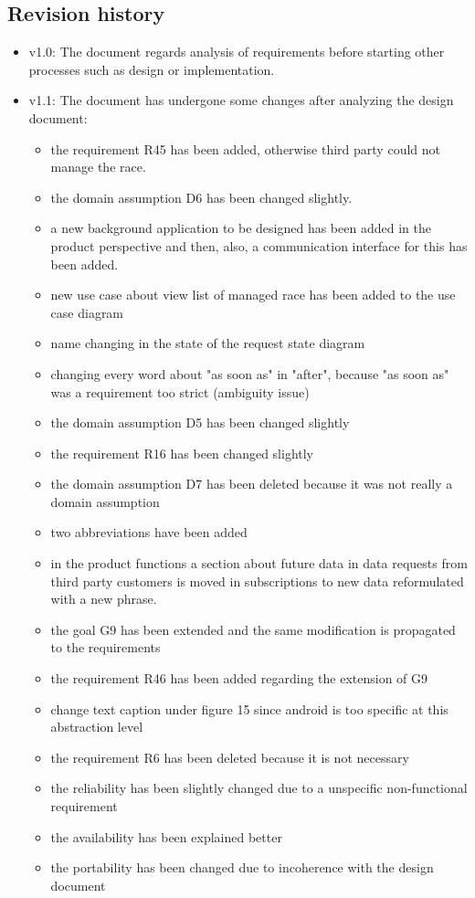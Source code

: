 \subsection{Revision history}
\begin{itemize}
\item v1.0: The document regards analysis of requirements before starting other processes such as design or implementation.
\item v1.1: The document has undergone some changes after analyzing the design document:
	\begin{itemize}
	\item the requirement R45 has been added, otherwise third party could not manage the race.
	\item the domain assumption D6 has been changed slightly.
	\item a new background application to be designed has been added in the product perspective and then, also, a communication interface for this has been added.
	\item new use case about view list of managed race has been added to the use case diagram 
	\item name changing in the state of the request state diagram
	\item changing every word about "as soon as" in "after", because "as soon as" was a requirement too strict (ambiguity issue)
	\item the domain assumption D5 has been changed slightly
	\item the requirement R16 has been changed slightly
	\item the domain assumption D7 has been deleted because it was not really a domain assumption
	\item two abbreviations have been added
	\item in the product functions a section about future data in data requests from third party customers is moved in subscriptions to new data reformulated with a new phrase.
	\item the goal G9 has been extended and the same modification is propagated to the requirements
	\item the requirement R46 has been added regarding the extension of G9
	\item change text caption under figure 15 since android is too specific at this abstraction level
	\item the requirement R6 has been deleted because it is not necessary
	\item the reliability has been slightly changed due to a unspecific non-functional requirement
	\item the availability has been explained better
	\item the portability has been changed due to incoherence with the design document
	\end{itemize}
\end{itemize}